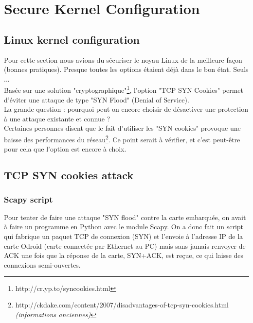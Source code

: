 
\chapter{Secure Kernel Configuration} %

\label{Chapitre 3} %


\section{Linux kernel configuration}
Pour cette section nous avions du sécuriser le noyau Linux de la meilleure façon (bonnes pratiques). Presque toutes les options étaient déjà dans le bon état. Seuls ... %
\\




Basée sur une solution "cryptographique"\footnote{http://cr.yp.to/syncookies.html}, l'option "TCP SYN Cookies" permet d'éviter une attaque de type "SYN Flood" (Denial of Service).\\
La grande question : pourquoi peut-on encore choisir de désactiver une protection à une attaque existante et connue ? \\

Certaines personnes disent que le fait d'utiliser les "SYN cookies" provoque une baisse des performances du réseau\footnote{http://ckdake.com/content/2007/disadvantages-of-tcp-syn-cookies.html \textit{(informations anciennes)}}. Ce point serait à vérifier, et c'est peut-être pour cela que l'option est encore à choix.


\section{TCP SYN cookies attack}
\subsection{Scapy script}

Pour tenter de faire une attaque "SYN flood" contre la carte embarquée, on avait à faire un programme en Python avec le module Scapy. On a donc fait un script qui fabrique un paquet TCP de connexion (SYN) et l'envoie à l'adresse IP de la carte Odroid (carte connectée par Ethernet au PC) mais sans jamais renvoyer de ACK une fois que la réponse de la carte, SYN+ACK, est reçue, ce qui laisse des connexions semi-ouvertes.\\


